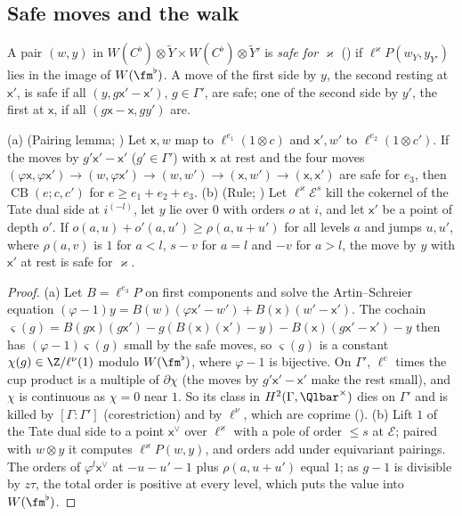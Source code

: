 \subsection{Safe moves and the walk}\label{cg-lifting:sec:walk}

A pair $(w,y)$ in $W(C^\flat)\otimes\tilde Y\times W(C^\flat)\otimes\tilde Y'$ is \emph{safe for
$\varkappa$} () if $\ell^\varkappa P(w_Y,y_{Y'})$ lies in the image of
$W(\fm^\flat)$. A move of the first side by $y$, the second resting at $\mathsf x'$, is safe if all
$(y,g\mathsf x'-\mathsf x')$, $g\in\Gamma'$, are safe; one of the second side by $y'$, the first at $\mathsf x$, if all
$(g\mathsf x-\mathsf x,gy')$ are.

\begin{lemma}\label{cg-lifting:lem:pairing}
(a) (Pairing lemma; ) Let $\mathsf x,w$ map to
$\ell^{e_1}(1\otimes c)$ and $\mathsf x',w'$ to $\ell^{e_2}(1\otimes c')$. If the moves by $g'\mathsf x'-\mathsf x'$ ($g'\in\Gamma'$) with
$\mathsf x$ at rest and the four moves $(\varphi\mathsf x,\varphi\mathsf x')\to(w,\varphi\mathsf x')\to(w,w')\to(\mathsf x,w')\to(\mathsf x,\mathsf x')$
are safe for $e_3$, then $\operatorname{CB}(e;c,c')$ for $e\ge e_1+e_2+e_3$.
(b) (Rule; ) Let
$\ell^\varkappa\mathcal E^s$ kill the cokernel of the Tate dual side at $i^{(-l)}$, let $y$ lie over $0$ with
orders $o$ at $i$, and let $\mathsf x'$ be a point of depth $o'$. If $o(a,u)+o'(a,u')\ge\rho(a,u+u')$ for
all levels $a$ and jumps $u,u'$, where $\rho(a,v)$ is $1$ for $a<l$, $s-v$ for $a=l$ and $-v$ for $a>l$, the move by $y$
with $\mathsf x'$ at rest is safe for $\varkappa$.
\end{lemma}

\begin{proof}
(a) Let $B=\ell^{e_3}P$ on first components and solve the Artin--Schreier equation
$(\varphi-1)y=B(w)(\varphi\mathsf x'-w')+B(\mathsf x)(w'-\mathsf x')$. The cochain
$\varsigma(g)=B(g\mathsf x)(g\mathsf x')-g(B(\mathsf x)(\mathsf x')-y)-B(\mathsf x)(g\mathsf x'-\mathsf x')-y$ then has $(\varphi-1)\varsigma(g)$ small by the safe moves,
so $\varsigma(g)$ is a constant $\chi(g)\in\Z/\ell^\nu(1)$ modulo $W(\fm^\flat)$, where $\varphi-1$ is
bijective. On $\Gamma'$, $\ell^e$ times the cup product is a multiple of $\partial\chi$ (the moves by
$g'\mathsf x'-\mathsf x'$ make the rest small), and $\chi$ is continuous as $\chi=0$ near $1$. So its class in
$H^2(\Gamma,\Qlbar^\times)$ dies on $\Gamma'$ and is killed by $[\Gamma:\Gamma']$ (corestriction) and
by $\ell^\nu$, which are coprime ().
(b) Lift $1$ of the Tate dual side to a point $\mathsf x^\vee$ over $\ell^\varkappa$ with a pole of order $\le s$ at
$\mathcal E$; paired with $w\otimes y$ it computes $\ell^\varkappa P(w,y)$, and orders add under equivariant
pairings. The orders of
$\varphi^l\mathsf x^\vee$ at $-u-u'-1$ plus $\rho(a,u+u')$ equal $1$; as $g-1$ is divisible by $z\tau$, the total order
is positive at every level, which puts the value into $W(\fm^\flat)$.
\end{proof}

